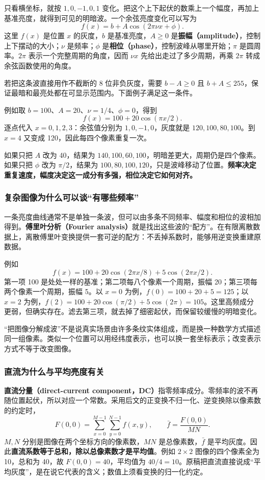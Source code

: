 只看横坐标，就按 $1,0,-1,0,1$ 变化。把这个上下起伏的数乘上一个幅度，再加上基准亮度，就得到可见的明暗波。一个余弦亮度变化可以写为
\[
f(x)=b+A\cos\!\left(2\pi\nu x+\phi\right).
\]
这里 $f(x)$ 是位置 $x$ 的灰度，$b$ 是基准亮度，$A\geq0$ 是\textbf{振幅（amplitude）}，控制上下摆动的大小；$\nu$ 是频率；$\phi$ 是\textbf{相位（phase）}，控制波峰从哪里开始；$\pi$ 是圆周率。$2\pi$ 表示一个完整周期的角度，因而 $\nu x$ 先给出走过了多少周期，再乘 $2\pi$ 转成余弦函数使用的角度。

若把这条波直接用作不截断的 8 位非负灰度，需要 $b-A\geq0$ 且 $b+A\leq255$，保证最暗和最亮处都在可显示范围内。下面例子满足这一条件。

例如取 $b=100$、$A=20$、$\nu=1/4$、$\phi=0$，得到
\[
f(x)=100+20\cos(\pi x/2).
\]
逐点代入 $x=0,1,2,3$：余弦值分别为 $1,0,-1,0$，灰度就是 $120,100,80,100$。到 $x=4$ 又变成 120，因此每四个像素重复一次。

如果只把 $A$ 改为 40，结果为 $140,100,60,100$，明暗差更大，周期仍是四个像素。如果只把 $\phi$ 改为 $\pi/2$，结果为 $100,80,100,120$，只是波峰移动了位置。\textbf{频率决定重复速度，幅度决定这一成分有多强，相位决定它如何对齐。}

\subsubsection{复杂图像为什么可以谈“有哪些频率”}
一条亮度曲线通常不是单独一条波，但可以由多条不同频率、幅度和相位的波相加得到。\textbf{傅里叶分析（Fourier analysis）}就是找出这些波的“配方”。在有限离散数据上，离散傅里叶变换提供一套可逆的配方：不丢掉系数时，能够用逆变换重建原数据。

例如
\[
f(x)=100+20\cos(2\pi x/8)+5\cos(2\pi x/2).
\]
第一项 100 是处处一样的基准；第二项每八个像素一个周期，振幅 20；第三项每两个像素一个周期，振幅 5。以 $x=0$ 为例，$f(0)=100+20+5=125$；以 $x=2$ 为例，$f(2)=100+20\cos(\pi/2)+5\cos(2\pi)=105$。这里高频成分更弱，但确实存在。滤去第三项，就去掉了细密起伏，而保留较缓慢的明暗变化。

“把图像分解成波”不是说真实场景由许多条纹实体组成，而是换一种数学方式描述同一组像素。类似一个位置可以用经纬度表示，也可以换一套坐标表示；改变表示方式不等于改变图像。

\subsubsection{直流为什么与平均亮度有关}
\textbf{直流分量（direct-current component，DC）}指零频率成分。零频率的波不再随位置起伏，所以对应一个常数。采用后文的正变换不归一化、逆变换除以像素数的约定时，
\[
F(0,0)=\sum_{x=0}^{M-1}\sum_{y=0}^{N-1} f(x,y),
\qquad
\bar f=\frac{F(0,0)}{MN}.
\]
$M,N$ 分别是图像在两个坐标方向的像素数，$MN$ 是总像素数，$\bar f$ 是平均灰度。因此\textbf{直流系数等于总和，除以总像素数才是平均值}。例如 $2\times2$ 图像的四个像素全为 10，总和为 40，故 $F(0,0)=40$，平均值为 $40/4=10$。原稿把直流直接说成“平均灰度”，是在说它代表的含义；数值上须看变换的归一化约定。

